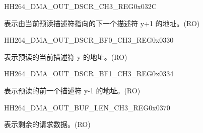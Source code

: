     
    \begin{register}{H}{H264\_DMA\_OUT\_DSCR\_CH3\_REG}{0x032C}\label{regdesc:H264DMAOUTDSCRCH3REG}
    \regnewline%
    \begin{regdesc}\begin{reglist}
    \label{fielddesc:H264DMAOUTLINKDSCRCH3}\item [H264\_DMA\_OUTLINK\_DSCR\_CH3] 表示由当前预读描述符指向的下一个描述符 y+1 的地址。(RO)
    \end{reglist}\end{regdesc}
    \end{register}
    
    
    \begin{register}{H}{H264\_DMA\_OUT\_DSCR\_BF0\_CH3\_REG}{0x0330}\label{regdesc:H264DMAOUTDSCRBF0CH3REG}
    \regnewline%
    \begin{regdesc}\begin{reglist}
    \label{fielddesc:H264DMAOUTLINKDSCRBF0CH3}\item [H264\_DMA\_OUTLINK\_DSCR\_BF0\_CH3] 表示预读的当前描述符 y 的地址。(RO)
    \end{reglist}\end{regdesc}
    \end{register}
    
    
    \begin{register}{H}{H264\_DMA\_OUT\_DSCR\_BF1\_CH3\_REG}{0x0334}\label{regdesc:H264DMAOUTDSCRBF1CH3REG}
    \regnewline%
    \begin{regdesc}\begin{reglist}
    \label{fielddesc:H264DMAOUTLINKDSCRBF1CH3}\item [H264\_DMA\_OUTLINK\_DSCR\_BF1\_CH3] 表示预读的前一个描述符 y-1 的地址。(RO)
    \end{reglist}\end{regdesc}
    \end{register}
    
    \begin{register}{H}{H264\_DMA\_OUT\_BUF\_LEN\_CH3\_REG}{0x0370}\label{regdesc:H264DMAOUTBUFLENCH3REG}
    \regnewline%
    \begin{regdesc}\begin{reglist}
    \label{fielddesc:H264DMAOUTCMDFIFOBUFLENHBCH3}\item [H264\_DMA\_OUT\_CMDFIFO\_BUF\_LEN\_HB\_CH3] 表示剩余的请求数据。(RO)\end{reglist}\end{regdesc}
    \end{register}
    
